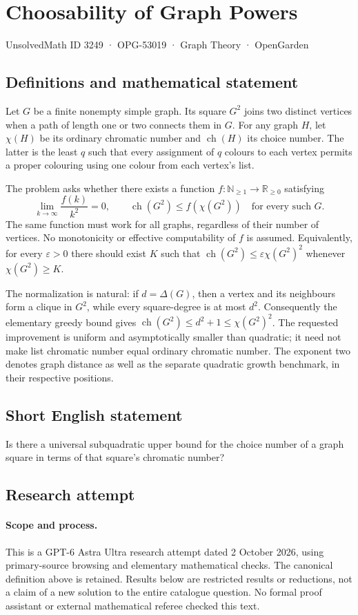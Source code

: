 \documentclass[11pt,a4paper]{article}
\begin{document}
\section*{Choosability of Graph Powers}\label{3249}
{\small UnsolvedMath ID 3249 · OPG-53019 · Graph Theory · OpenGarden}
\subsection{Definitions and mathematical statement}
Let $G$ be a finite nonempty simple graph. Its square $G^2$ joins two
distinct vertices when a path of length one or two connects them in $G$.
For any graph $H$, let $\chi(H)$ be its ordinary chromatic number and
$\operatorname{ch}(H)$ its choice number. The latter is the least $q$
such that every assignment of $q$ colours to each vertex permits a proper
colouring using one colour from each vertex's list.

The problem asks whether there exists a function
$f:\mathbb N_{\ge1}\to\mathbb R_{\ge0}$ satisfying
\[
 \lim_{k\to\infty}\frac{f(k)}{k^2}=0,
 \qquad
 \operatorname{ch}(G^2)\le f(\chi(G^2))
 \quad\text{for every such }G.
\]
The same function must work for all graphs, regardless of their number
of vertices. No monotonicity or effective computability of $f$ is assumed.
Equivalently, for every $\varepsilon>0$ there should exist $K$ such that
$\operatorname{ch}(G^2)\le\varepsilon\chi(G^2)^2$ whenever
$\chi(G^2)\ge K$.

The normalization is natural: if $d=\Delta(G)$, then a vertex and its
neighbours form a clique in $G^2$, while every square-degree is at most
$d^2$. Consequently the elementary greedy bound gives
$\operatorname{ch}(G^2)\le d^2+1\le\chi(G^2)^2$.
The requested improvement is uniform and asymptotically smaller than
quadratic; it need not make list chromatic number equal ordinary
chromatic number. The exponent two denotes graph distance as well as
the separate quadratic growth benchmark, in their respective positions.
\subsection{Short English statement}
Is there a universal subquadratic upper bound for the choice number of a graph square in terms of that square’s chromatic number?
\subsection{Research attempt}
\paragraph{Scope and process.}
This is a GPT-6 Astra Ultra research attempt dated 2 October 2026, using
primary-source browsing and elementary mathematical checks. The canonical
definition above is retained. Results below are restricted results or
reductions, not a claim of a new solution to the entire catalogue question.
No formal proof assistant or external mathematical referee checked this text.
\end{document}
